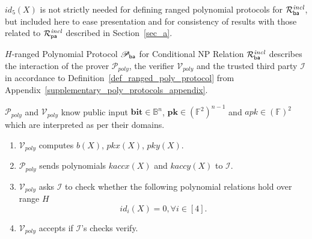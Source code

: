 \noindent %
$id_5(X)$ is not strictly needed for defining ranged polynomial protocols 
for $\mathcal{R}^{\mathit{incl}}_{\mathsf{ba}}$, but included here to ease presentation and for consistency 
of results with those related to $\mathcal{R}^{\mathit{incl}}_{\mathsf{pa}}$ described in Section~\ref{sec_a}. \\
\vspace{-0.10in}

\noindent \textsf{$H$-ranged Polynomial Protocol $\mathscr{P}_{\mathsf{ba}}$ for Conditional NP Relation $\mathcal{R}^{\mathit{incl}}_{\mathsf{ba}}$} describes the interaction of the prover 
$\mathcal{P}_{poly}$, the verifier $\mathcal{V}_{poly}$ and the trusted third party $\mathcal{I}$ 
in accordance to Definition~\ref{def_ranged_poly_protocol} from Appendix~\ref{supplementary_poly_protocols_appendix}. \\
\vspace{-0.15in}

\noindent $\mathcal{P}_{poly}$ and $\mathcal{V}_{poly}$ know public input 
$\mathbf{bit} \in \mathbb{B}^n$, $\mathbf{pk} \in (\mathbb{F}^2)^{n-1}$ and $\mathit{apk} \in (\mathbb{F})^2$ 
which are interpreted as per their %
domains.
\begin{enumerate}
\item $\mathcal{V}_{poly}$ computes $b(X)$, $pkx(X)$, $pky(X)$.
\item $\mathcal{P}_{poly}$ sends polynomials $kaccx(X)$ and $kaccy(X)$ to $\mathcal{I}$. 
\item $\mathcal{V}_{poly}$ asks $\mathcal{I}$ to check whether the following polynomial relations hold over range $H$ 
$$id_i(X) = 0, \forall i \in [4].$$
\item $\mathcal{V}_{poly}$  accepts if $\mathcal{I}$'s checks verify. 
\end{enumerate}

